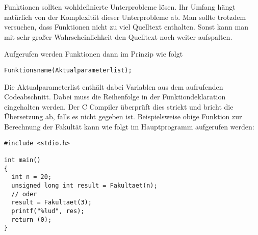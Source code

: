 Funktionen sollten wohldefinierte Unterprobleme lösen.
Ihr Umfang hängt natürlich von der Komplexität dieser Unterprobleme ab.
Man sollte trotzdem versuchen, dass Funktionen nicht zu viel Quelltext enthalten.
Sonst kann man mit sehr großer Wahrscheinlichkeit den Quelltext noch weiter aufspalten.

Aufgerufen werden Funktionen dann im Prinzip wie folgt
\begin{lstlisting}
Funktionsname(Aktualparameterlist);
\end{lstlisting}
Die Aktualparameterlist enthält dabei Variablen aus dem aufrufenden Codeabschnitt.
Dabei muss die Reihenfolge in der Funktiondeklaration eingehalten werden.
Der C Compiler überprüft dies strickt und bricht die Übersetzung ab, falls es nicht gegeben ist.
Beispielsweise obige Funktion zur Berechnung der Fakultät kann wie folgt im Hauptprogramm aufgerufen werden:
\begin{lstlisting}
#include <stdio.h>

int main()
{
  int n = 20;
  unsigned long int result = Fakultaet(n);
  // oder
  result = Fakultaet(3);
  printf("%lud", res);
  return (0);
}
\end{lstlisting}

\endinput
